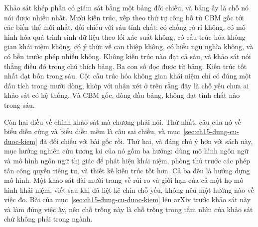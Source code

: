 %
Khảo sát khép phần có giám sát bằng một bảng đối chiếu, và bảng ấy là chỗ nó nói
được nhiều nhất. Mười kiến trúc, xếp theo thứ tự công bố từ CBM gốc
tới các biến thể mới nhất, đối chiếu với sáu tính chất: có chống rò rỉ không, có
mô hình hóa quá trình sinh dữ liệu theo lối xác suất không, có cấu trúc hóa
không gian khái niệm không, có ý thức về can thiệp không, có hiểu ngữ nghĩa
không, và có bền trước phép nhiễu không. Không kiến trúc nào đạt cả sáu, và
khảo sát nói thẳng điều đó trong chú thích bảng. Ba con số đọc được từ bảng.
Kiến trúc tốt nhất đạt bốn trong sáu. Cột cấu trúc hóa không gian khái niệm
chỉ có đúng một dấu tích trong mười dòng, khớp với nhận xét ở trên rằng đây là
chỗ yếu chưa ai khảo sát có hệ thống. Và CBM gốc, dòng đầu bảng,
không đạt tính chất nào trong sáu.

%
Còn hai điều về chính khảo sát mà chương phải nói. Thứ nhất, câu của nó về biểu
diễn cứng và biểu diễn mềm là câu sai chiều, và
mục~\ref{sec:ch15-dung-cu-duoc-kiem} đã đối chiếu với bài gốc rồi. Thứ hai, và
đáng chú ý hơn với sách này, mục hướng nghiên cứu tương lai của nó gồm ba hướng:
dùng mô hình ngôn ngữ và mô hình ngôn ngữ thị giác để phát hiện khái niệm, phòng
thủ trước các phép tấn công quyền riêng tư, và thiết kế kiến trúc tốt hơn. Cả ba
đều là hướng dựng mô hình. Một khảo sát dài mười trang về rủi ro và giới hạn của
cả một họ mô hình khái niệm, viết sau khi đã liệt kê chín chỗ yếu, không nêu một
hướng nào về việc đo. Bài của mục~\ref{sec:ch15-dung-cu-duoc-kiem} lên arXiv
trước khảo sát này và làm đúng việc ấy, nên chỗ trống này là chỗ trống trong tầm
nhìn của khảo sát chứ không phải trong ngành.

